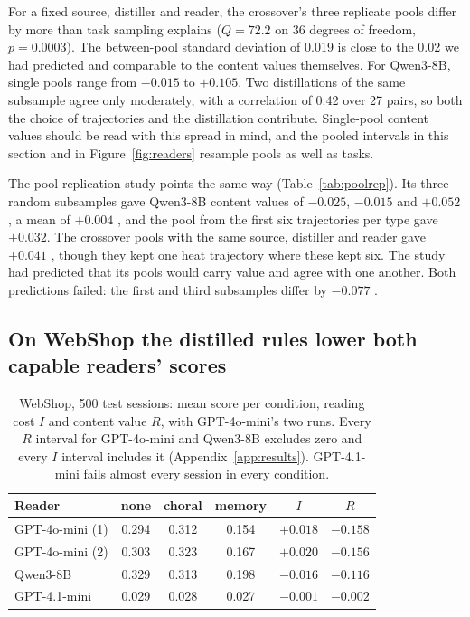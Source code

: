 For a fixed source, distiller and reader, the crossover's three replicate pools differ by more than task
sampling explains ($Q=72.2$ on 36 degrees of freedom, $p=0.0003$). The between-pool standard deviation
of 0.019 is close to the 0.02 we had predicted and comparable to the content values themselves. For
Qwen3-8B, single pools range from $-0.015$ to $+0.105$. Two distillations of the same subsample agree
only moderately, with a correlation of 0.42 over 27 pairs, so both the choice of trajectories and the
distillation contribute. Single-pool content values should be read with this spread in mind, and the
pooled intervals in this section and in Figure~\ref{fig:readers} resample pools as well as tasks.

The pool-replication study points the same way (Table~\ref{tab:poolrep}). Its three random subsamples
gave Qwen3-8B content values of $-0.025$, $-0.015$ and $+0.052$, a mean of $+0.004$ ,
and the pool from the first six trajectories per type gave $+0.032$. The crossover pools with the same
source, distiller and reader gave $+0.041$ , though they kept one heat trajectory where
these kept six. The study had predicted that its pools would carry value and agree with one another.
Both predictions failed: the first and third subsamples differ by $-0.077$ .

\subsection{On WebShop the distilled rules lower both capable readers' scores}
\label{sec:webshop}

\begin{table}[!b]
\centering
\small
\setlength{\tabcolsep}{2.6pt}
\renewcommand{\arraystretch}{1.12}
\begin{tabular}{@{}lcccrr@{}}
\toprule
Reader & none & choral & memory & \multicolumn{1}{c}{$I$} & \multicolumn{1}{c}{$R$} \\
\midrule
GPT-4o-mini (1) & 0.294 & 0.312 & 0.154 & $+0.018$ & $-0.158$ \\
GPT-4o-mini (2) & 0.303 & 0.323 & 0.167 & $+0.020$ & $-0.156$ \\
Qwen3-8B & 0.329 & 0.313 & 0.198 & $-0.016$ & $-0.116$ \\
GPT-4.1-mini & 0.029 & 0.028 & 0.027 & $-0.001$ & $-0.002$ \\
\bottomrule
\end{tabular}
\caption{WebShop, 500 test sessions: mean score per condition, reading cost $I$ and content value $R$,
with GPT-4o-mini's two runs. Every $R$ interval for GPT-4o-mini and Qwen3-8B excludes zero and every $I$
interval includes it (Appendix~\ref{app:results}). GPT-4.1-mini fails almost every session in every
condition.}
\label{tab:webshop}
\end{table}

